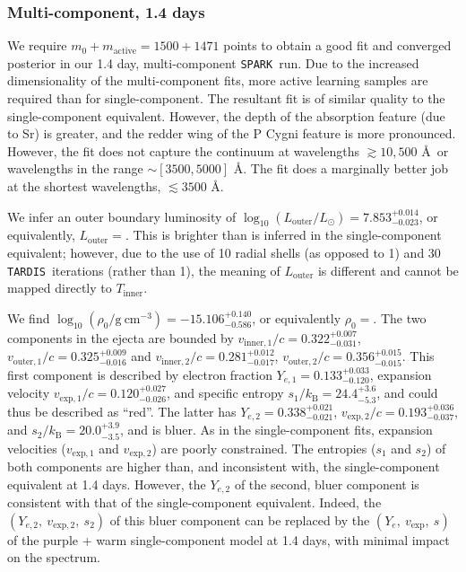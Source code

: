 \documentclass[twocolumn, twocolappendix]{aastex63}
\def\SPARK{\texttt{SPARK}}
\def\TARDIS{\texttt{TARDIS}}
\begin{document}
\subsubsection{Multi-component, 1.4 days}\label{sssc:1.4_multi}

We require $m_0 + m_{\mathrm{active}} = 1500 + 1471$ points to obtain a good fit and converged posterior in our 1.4 day, multi-component \SPARK~run. Due to the increased dimensionality of the multi-component fits, more active learning samples are required than for single-component. The resultant fit is of similar quality to the single-component equivalent. However, the depth of the absorption feature (due to Sr) is greater, and the redder wing of the P Cygni feature is more pronounced. However, the fit does not capture the continuum at wavelengths $\gtrsim 10,500$ \AA~or wavelengths in the range $\sim[3500, 5000]$ \AA. The fit does a marginally better job at the shortest wavelengths, $\lesssim 3500$ \AA. 

We infer an outer boundary luminosity of $\log_{10} (L_{\mathrm{outer}}/L_{\odot}) = 7.853^{+0.014}_{-0.023}$, or equivalently, $L_{\mathrm{outer}} = $. This is brighter than is inferred in the single-component equivalent; however, due to the use of 10 radial shells (as opposed to 1) and 30 \TARDIS~iterations (rather than 1), the meaning of $L_{\mathrm{outer}}$ is different and cannot be mapped directly to $T_{\mathrm{inner}}$. 

We find $\log_{10} (\rho_0 / \mathrm{g~cm^{-3}}) = -15.106^{+0.140}_{-0.586}$, or equivalently $\rho_0 = $. The two components in the ejecta are bounded by $v_{\mathrm{inner,1}}/c = 0.322^{+0.007}_{-0.031}$, $v_{\mathrm{outer,1}}/c = 0.325^{+0.009}_{-0.016}$ and $v_{\mathrm{inner,2}}/c = 0.281^{+0.012}_{-0.017}$, $v_{\mathrm{outer,2}}/c = 0.356^{+0.015}_{-0.015}$. This first component is described by electron fraction $Y_{e,1} = 0.133^{+0.033}_{-0.120}$, expansion velocity $v_{\mathrm{exp},1}/c = 0.120^{+0.027}_{-0.026}$, and specific entropy $s_1 / k_{\mathrm{B}} = 24.4^{+3.6}_{-5.3}$, and could thus be described as ``red''. The latter has $Y_{e,2} = 0.338^{+0.021}_{-0.021}$, $v_{\mathrm{exp},2}/c = 0.193^{+0.036}_{-0.037}$, and $s_2 / k_{\mathrm{B}} = 20.0^{+3.9}_{-3.5}$, and is bluer. As in the single-component fits, expansion velocities ($v_{\mathrm{exp},1}$ and $v_{\mathrm{exp},2}$) are poorly constrained. The entropies ($s_1$ and $s_2$) of both components are higher than, and inconsistent with, the single-component equivalent at 1.4 days. However, the $Y_{e,2}$ of the second, bluer component is consistent with that of the single-component equivalent. Indeed, the $(Y_{e,2},~v_{\mathrm{exp},2},~s_2)$ of this bluer component can be replaced by the $(Y_e,~v_{\mathrm{exp}},~s)$ of the purple + warm single-component model at 1.4 days, with minimal impact on the spectrum. 
\end{document}
